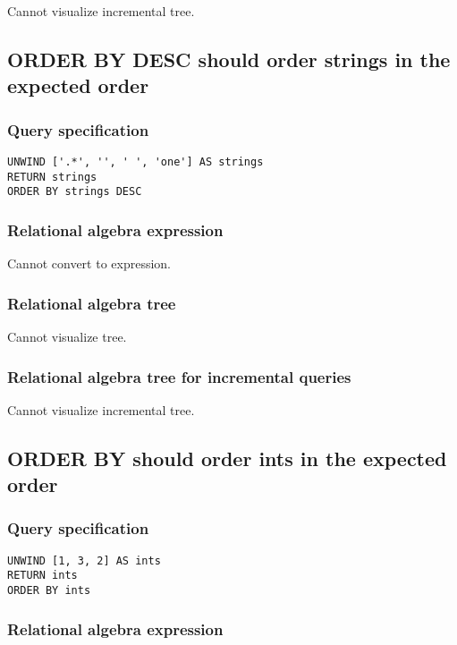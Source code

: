 Cannot visualize incremental tree.

\subsection{ORDER BY DESC should order strings in the expected order}

\subsubsection*{Query specification}

\begin{lstlisting}
UNWIND ['.*', '', ' ', 'one'] AS strings
RETURN strings
ORDER BY strings DESC
\end{lstlisting}

\subsubsection*{Relational algebra expression}

Cannot convert to expression.

\subsubsection*{Relational algebra tree}

Cannot visualize tree.

\subsubsection*{Relational algebra tree for incremental queries}

Cannot visualize incremental tree.

\subsection{ORDER BY should order ints in the expected order}

\subsubsection*{Query specification}

\begin{lstlisting}
UNWIND [1, 3, 2] AS ints
RETURN ints
ORDER BY ints
\end{lstlisting}

\subsubsection*{Relational algebra expression}

